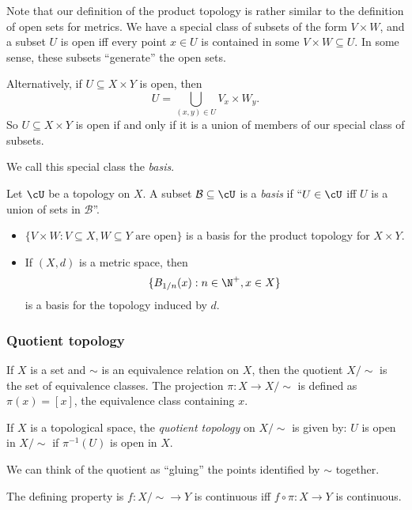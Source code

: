 \documentclass[a4paper]{article}
\begin{document}
Note that our definition of the product topology is rather similar to the definition of open sets for metrics. We have a special class of subsets of the form $V\times W$, and a subset $U$ is open iff every point $x\in U$ is contained in some $V\times W\subseteq U$. In some sense, these subsets ``generate'' the open sets.

Alternatively, if $U\subseteq X\times Y$ is open, then
\[
  U = \bigcup_{(x, y)\in U} V_x\times W_y.
\]
So $U\subseteq X\times Y$ is open if and only if it is a union of members of our special class of subsets.

We call this special class the \emph{basis}.

\begin{defi}[Basis]
  Let $\cU$ be a topology on $X$. A subset $\mathcal{B} \subseteq \cU$ is a \emph{basis} if ``$U\in \cU$ iff $U$ is a union of sets in $\mathcal{B}$''.
\end{defi}

\begin{eg}\leavevmode
  \begin{itemize}
    \item $\{V\times W: V\subseteq X, W\subseteq Y\text{ are open}\}$ is a basis for the product topology for $X\times Y$.
    \item If $(X, d)$ is a metric space, then
      \[
        \{B_{1/n}(x): n\in \N^+, x\in X\}
      \]
      is a basis for the topology induced by $d$.
  \end{itemize}
\end{eg}

\subsubsection{Quotient topology}
If $X$ is a set and $\sim$ is an equivalence relation on $X$, then the quotient $X/{\sim}$ is the set of equivalence classes. The projection $\pi: X\to X/{\sim}$ is defined as $\pi(x) = [x]$, the equivalence class containing $x$.

\begin{defi}
  If $X$ is a topological space, the \emph{quotient topology} on $X/{\sim}$ is given by: $U$ is open in $X/{\sim}$ if $\pi^{-1}(U)$ is open in $X$.
\end{defi}
We can think of the quotient as ``gluing'' the points identified by $\sim$ together.

The defining property is $f: X/{\sim} \to Y$ is continuous iff $f\circ \pi: X\to Y$ is continuous.
\end{document}

